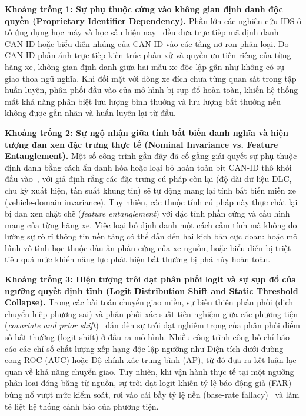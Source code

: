 \documentclass[12pt, a4paper, reqno, oneside]{book}
\begin{document}
\textbf{Khoảng trống 1: Sự phụ thuộc cứng vào không gian định danh độc quyền (Proprietary Identifier Dependency).} 
Phần lớn các nghiên cứu IDS ô tô ứng dụng học máy và học sâu hiện nay~\cite{song2020dcnn,won2026canbertplus,balasubramanian2025canlp} đều đưa trực tiếp mã định danh CAN-ID hoặc biểu diễn nhúng của CAN-ID vào các tầng nơ-ron phân loại. Do CAN-ID phản ánh trực tiếp kiến trúc phân xử và quyền ưu tiên riêng của từng hãng xe, không gian định danh giữa hai mẫu xe độc lập gần như không có sự giao thoa ngữ nghĩa. Khi đối mặt với dòng xe đích chưa từng quan sát trong tập huấn luyện, phân phối đầu vào của mô hình bị sụp đổ hoàn toàn, khiến hệ thống mất khả năng phân biệt lưu lượng bình thường và lưu lượng bất thường nếu không được gắn nhãn và huấn luyện lại từ đầu.

\textbf{Khoảng trống 2: Sự ngộ nhận giữa tính bất biến danh nghĩa và hiện tượng đan xen đặc trưng thực tế (Nominal Invariance vs. Feature Entanglement).}
Một số công trình gần đây đã cố gắng giải quyết sự phụ thuộc định danh bằng cách ẩn danh hóa hoặc loại bỏ hoàn toàn bit CAN-ID thô khỏi đầu vào~\cite{obafemi2026travel,khreasat2026relational}, với giả định rằng các đặc trưng cú pháp còn lại (độ dài dữ liệu DLC, chu kỳ xuất hiện, tần suất khung tin) sẽ tự động mang lại tính bất biến miền xe (vehicle-domain invariance). Tuy nhiên, các thuộc tính cú pháp này thực chất lại bị đan xen chặt chẽ (\textit{feature entanglement}) với đặc tính phần cứng và cấu hình mạng của từng hãng xe. Việc loại bỏ định danh một cách cảm tính mà không đo lường sự rò rỉ thông tin nền tảng có thể dẫn đến hai kịch bản cực đoan: hoặc mô hình vô tình học thuộc dấu ấn phần cứng của xe nguồn, hoặc biểu diễn bị triệt tiêu quá mức khiến năng lực phát hiện bất thường bị phá hủy hoàn toàn.

\textbf{Khoảng trống 3: Hiện tượng trôi dạt phân phối logit và sự sụp đổ của ngưỡng quyết định tĩnh (Logit Distribution Shift and Static Threshold Collapse).}
Trong các bài toán chuyển giao miền, sự biến thiên phân phối (dịch chuyển hiệp phương sai) và phân phối xác suất tiên nghiệm giữa các phương tiện (\textit{covariate and prior shift})~\cite{shimodaira2000covariate,morenotorres2012shift} dẫn đến sự trôi dạt nghiêm trọng của phân phối điểm số bất thường (logit shift) ở đầu ra mô hình. Nhiều công trình công bố chỉ báo cáo các chỉ số chất lượng xếp hạng độc lập ngưỡng như Diện tích dưới đường cong ROC (AUC) hoặc Độ chính xác trung bình (AP), từ đó đưa ra kết luận lạc quan về khả năng chuyển giao. Tuy nhiên, khi vận hành thực tế tại một ngưỡng phân loại đóng băng từ nguồn, sự trôi dạt logit khiến tỷ lệ báo động giả (FAR) bùng nổ vượt mức kiểm soát, rơi vào cái bẫy tỷ lệ nền (base-rate fallacy)~\cite{axelsson2000base,sommer2010outside} và làm tê liệt hệ thống cảnh báo của phương tiện.
\end{document}
